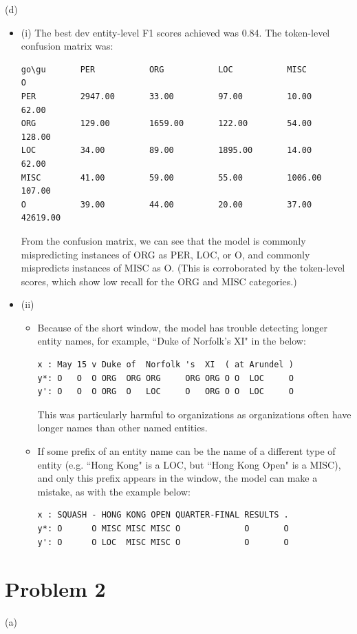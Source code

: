 \documentclass{article}
\begin{document}
(d)
\begin{itemize}
\item (i) The best dev entity-level F1 scores achieved was 0.84. The token-level confusion matrix was:
\begin{verbatim}
go\gu       PER           ORG           LOC           MISC          O
PER         2947.00       33.00         97.00         10.00         62.00
ORG         129.00        1659.00       122.00        54.00         128.00
LOC         34.00         89.00         1895.00       14.00         62.00
MISC        41.00         59.00         55.00         1006.00       107.00
O           39.00         44.00         20.00         37.00         42619.00
\end{verbatim}
From the confusion matrix, we can see that the model is commonly mispredicting instances of ORG as PER, LOC, or O,  and commonly mispredicts instances of MISC as O. (This is corroborated by the token-level scores, which show low recall for the ORG and MISC categories.)
\item (ii)
\begin{itemize}
\item Because of the short window, the model has trouble detecting longer entity names, for example, ``Duke of Norfolk's XI" in the below:
\begin{verbatim}
x : May 15 v Duke of  Norfolk 's  XI  ( at Arundel )
y*: O   O  O ORG  ORG ORG     ORG ORG O O  LOC     O
y': O   O  O ORG  O   LOC     O   ORG O O  LOC     O
\end{verbatim}
This was particularly harmful to organizations as organizations often have longer names than other named entities.
\item If some prefix of an entity name can be the name of a different type of entity (e.g. ``Hong Kong" is a LOC, but ``Hong Kong Open" is a MISC), and only this prefix appears in the window, the model can make a mistake, as with the example below:
\begin{verbatim}
x : SQUASH - HONG KONG OPEN QUARTER-FINAL RESULTS .
y*: O      O MISC MISC MISC O             O       O
y': O      O LOC  MISC MISC O             O       O
\end{verbatim}
\end{itemize}
\end{itemize}

\section{Problem 2}
(a)
\end{document}

